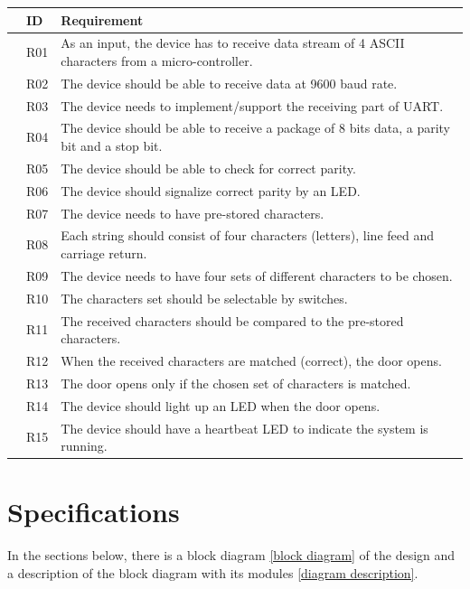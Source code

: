 \documentclass[a4paper, twoside]{report}
\begin{document}
\begin{flushleft}
    \begin{tabular}{| l | l | p{13cm}|}
    \hline
    	& ID & Requirement \\ \hline
   		& R01 & As an input, the device has to receive data stream of 4 ASCII characters from a micro-controller. \\ \hline
   		& R02 & The device should be able to receive data at 9600 baud rate. \\ \hline
   		& R03 & The device needs to implement/support the receiving part of UART. \\ \hline
   		& R04 & The device should be able to receive a package of 8 bits data, a parity bit and a stop bit. \\ \hline
   		& R05 & The device should be able to check for correct parity. \\ \hline
   		& R06 & The device should signalize correct parity by an LED. \\ \hline
   		& R07 & The device needs to have pre-stored characters. \\ \hline
   		& R08 & Each string should consist of four characters (letters), line feed and carriage return. \\ \hline
   		& R09 & The device needs to have four sets of different characters to be chosen. \\ \hline
   		& R10 & The characters set should be selectable by switches. \\ \hline
   		& R11 & The received characters should be compared to the pre-stored characters. \\ \hline
   		& R12 & When the received characters are matched (correct), the door opens. \\ \hline
   		& R13 & The door opens only if the chosen set of characters is matched. \\ \hline
   		& R14 & The device should light up an LED when the door opens. \\ \hline
   		& R15 & The device should have a heartbeat LED to indicate the system is running. \\ \hline
   		
    \end{tabular}
\end{flushleft}

\newpage
\chapter{Specifications}
In the sections below, there is a block diagram \ref{block diagram} of the design and a description of the block diagram with its modules \ref{diagram description}.\par 
\end{document}
